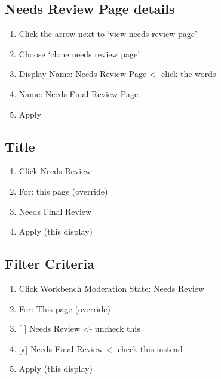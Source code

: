 \documentclass[letterpaper,10pt,english]{sphinxmanual}
\begin{document}
\subsection{Needs Review Page details}
\label{moderation:needs-review-page-details}\begin{enumerate}
\item {} 
Click the arrow next to `view needs review page'

\item {} 
Choose `clone needs review page'

\item {} 
Display Name: Needs Review Page \textless{}- click the words

\item {} 
Name: Needs Final Review Page

\item {} 
Apply

\end{enumerate}


\subsection{Title}
\label{moderation:title}\begin{enumerate}
\item {} 
Click Needs Review

\item {} 
For: this page (override)

\item {} 
Needs Final Review

\item {} 
Apply (this display)

\end{enumerate}


\subsection{Filter Criteria}
\label{moderation:filter-criteria}\begin{enumerate}
\item {} 
Click Workbench Moderation State: Needs Review

\item {} 
For: This page (override)

\item {} 
{[} {]} Needs Review \textless{}- uncheck this

\item {} 
{[}√{]} Needs Final Review \textless{}- check this instead

\item {} 
Apply (this display)

\end{enumerate}
\end{document}
